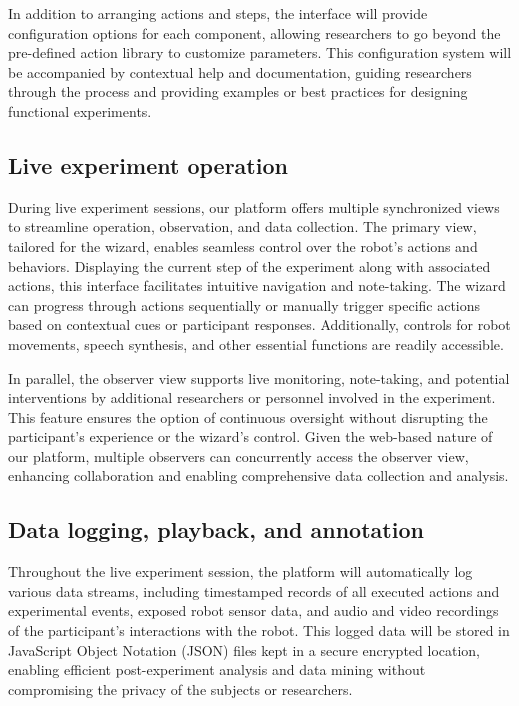 \documentclass[letterpaper, 10 pt, conference]{ieeeconf}
\begin{document}
In addition to arranging actions and steps, the interface will provide configuration options for each component, allowing researchers to go beyond the pre-defined action library to customize parameters. This configuration system will be accompanied by contextual help and documentation, guiding researchers through the process and providing examples or best practices for designing functional experiments. 

\subsection{Live experiment operation}

During live experiment sessions, our platform offers multiple synchronized views to streamline operation, observation, and data collection. The primary view, tailored for the wizard, enables seamless control over the robot's actions and behaviors. Displaying the current step of the experiment along with associated actions, this interface facilitates intuitive navigation and note-taking. The wizard can progress through actions sequentially or manually trigger specific actions based on contextual cues or participant responses. Additionally, controls for robot movements, speech synthesis, and other essential functions are readily accessible.

In parallel, the observer view supports live monitoring, note-taking, and potential interventions by additional researchers or personnel involved in the experiment. This feature ensures the option of continuous oversight without disrupting the participant's experience or the wizard's control. Given the web-based nature of our platform, multiple observers can concurrently access the observer view, enhancing collaboration and enabling comprehensive data collection and analysis.

\subsection{Data logging, playback, and annotation}

Throughout the live experiment session, the platform will automatically log various data streams, including timestamped records of all executed actions and experimental events, exposed robot sensor data, and audio and video recordings of the participant's interactions with the robot. This logged data will be stored in JavaScript Object Notation (JSON) files kept in a secure encrypted location, enabling efficient post-experiment analysis and data mining without compromising the privacy of the subjects or researchers.
\end{document}
